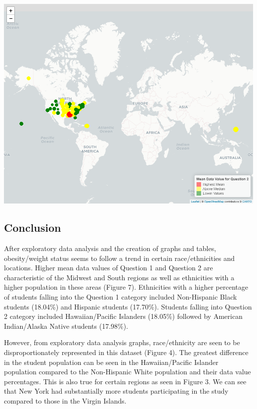 \documentclass[
]{article}
\begin{document}
\includegraphics{FinalPM566---Rmarkdown_files/figure-latex/unnamed-chunk-35-1.png}

\subsection{Conclusion}\label{conclusion}

After exploratory data analysis and the creation of graphs and tables,
obesity/weight status seems to follow a trend in certain
race/ethnicities and locations. Higher mean data values of Question 1
and Question 2 are characteristic of the Midwest and South regions as
well as ethnicities with a higher population in these areas (Figure 7).
Ethnicities with a higher percentage of students falling into the
Question 1 category included Non-Hispanic Black students (18.04\%) and
Hispanic students (17.70\%). Students falling into Question 2 category
included Hawaiian/Pacific Islanders (18.05\%) followed by American
Indian/Alaska Native students (17.98\%).

However, from exploratory data analysis graphs, race/ethnicity are seen
to be disproportionately represented in this dataset (Figure 4). The
greatest difference in the student population can be seen in the
Hawaiian/Pacific Islander population compared to the Non-Hispanic White
population and their data value percentages. This is also true for
certain regions as seen in Figure 3. We can see that New York had
substantially more students participating in the study compared to those
in the Virgin Islands.
\end{document}
